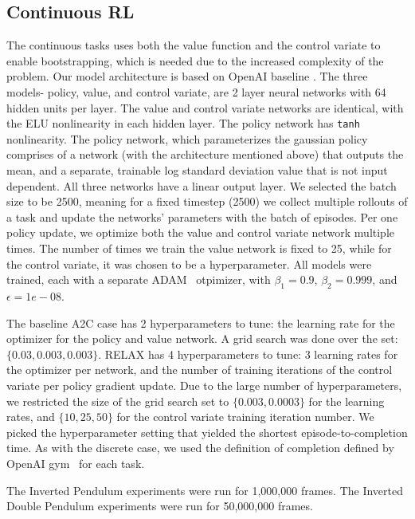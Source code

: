 \documentclass{article}
\newcommand{\RELAX}{{\textnormal{RELAX}}}
\begin{document}
\subsection{Continuous RL}
The continuous tasks uses both the value function and the control variate to enable bootstrapping, which is needed due to the increased complexity of the problem. Our model architecture is based on OpenAI baseline \citep{baselines}.
The three models- policy, value, and control variate, are 2 layer neural networks with 64 hidden units per layer.
The value and control variate networks are identical, with the ELU\citep{Clevert2016ELUs} nonlinearity in each hidden layer.
The policy network has \texttt{tanh} nonlinearity.
The policy network, which parameterizes the gaussian policy comprises of a network (with the architecture mentioned above) that outputs the mean, and a separate, trainable log standard deviation value that is not input dependent.
All three networks have a linear output layer.
We selected the batch size to be 2500, meaning for a fixed timestep (2500) we collect multiple rollouts of a task and update the networks' parameters with the batch of episodes.
Per one policy update, we optimize both the value and control variate network multiple times.
The number of times we train  the value network is fixed to 25, while for the control variate, it was chosen to be a hyperparameter. 
All models were trained, each with a separate ADAM~\citep{kingma2015adam} otpimizer, with $\beta_1=0.9$, $\beta_2=0.999$, and $\epsilon=1e-08$. 

The baseline A2C case has 2 hyperparameters to tune: the learning rate for the optimizer for the policy and value network.
A grid search was done over the set: $\{0.03, 0.003, 0.003\}$.
\RELAX{} has 4 hyperparameters to tune: 3 learning rates for the optimizer per network, and the number of training iterations of the control variate per policy gradient update.
Due to the large number of hyperparameters, we restricted the size of the grid search set to $\{0.003, 0.0003\}$ for the learning rates, and $\{10, 25, 50\}$ for the control variate training iteration number.
We picked the hyperparameter setting that yielded the shortest episode-to-completion time.
As with the discrete case, we used the definition of completion defined by OpenAI gym~\citep{1606.01540} for each task. 

The Inverted Pendulum experiments were run for 1,000,000 frames.
The Inverted Double Pendulum experiments were run for 50,000,000 frames.
\end{document}
